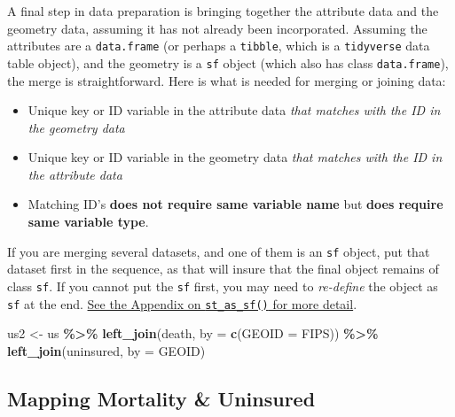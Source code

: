 \documentclass[
]{book}
\newenvironment{Shaded}{\begin{snugshade}}{\end{snugshade}}
\newcommand{\AttributeTok}[1]{\textcolor[rgb]{0.13,0.29,0.53}{#1}}
\newcommand{\FunctionTok}[1]{\textcolor[rgb]{0.13,0.29,0.53}{\textbf{#1}}}
\newcommand{\NormalTok}[1]{#1}
\newcommand{\OtherTok}[1]{\textcolor[rgb]{0.56,0.35,0.01}{#1}}
\newcommand{\SpecialCharTok}[1]{\textcolor[rgb]{0.81,0.36,0.00}{\textbf{#1}}}
\newcommand{\StringTok}[1]{\textcolor[rgb]{0.31,0.60,0.02}{#1}}
\providecommand{\tightlist}{%
  \setlength{\itemsep}{0pt}\setlength{\parskip}{0pt}}
\begin{document}
A final step in data preparation is bringing together the attribute data and the geometry data, assuming it has not already been incorporated. Assuming the attributes are a \texttt{data.frame} (or perhaps a \texttt{tibble}, which is a \texttt{tidyverse} data table object), and the geometry is a \texttt{sf} object (which also has class \texttt{data.frame}), the merge is straightforward. Here is what is needed for merging or joining data:

\begin{itemize}
\tightlist
\item
  Unique key or ID variable in the attribute data \emph{that matches with the ID in the geometry data}
\item
  Unique key or ID variable in the geometry data \emph{that matches with the ID in the attribute data}
\item
  Matching ID's \textbf{does not require same variable name} but \textbf{does require same variable type}.
\end{itemize}

If you are merging several datasets, and one of them is an \texttt{sf} object, put that dataset first in the sequence, as that will insure that the final object remains of class \texttt{sf}. If you cannot put the \texttt{sf} first, you may need to \emph{re-define} the object as \texttt{sf} at the end. \protect\hyperlink{st-as-sf}{See the Appendix on \texttt{st\_as\_sf()} for more detail}.

\begin{Shaded}
\begin{Highlighting}[]
\NormalTok{us2 }\OtherTok{\textless{}{-}}\NormalTok{ us }\SpecialCharTok{\%\textgreater{}\%}
  \FunctionTok{left\_join}\NormalTok{(death, }\AttributeTok{by =} \FunctionTok{c}\NormalTok{(}\StringTok{\textquotesingle{}GEOID\textquotesingle{}} \OtherTok{=} \StringTok{\textquotesingle{}FIPS\textquotesingle{}}\NormalTok{)) }\SpecialCharTok{\%\textgreater{}\%}
  \FunctionTok{left\_join}\NormalTok{(uninsured, }\AttributeTok{by =} \StringTok{\textquotesingle{}GEOID\textquotesingle{}}\NormalTok{)}
\end{Highlighting}
\end{Shaded}

\hypertarget{mapping-mortality-uninsured}{%
\subsection{Mapping Mortality \& Uninsured}\label{mapping-mortality-uninsured}}
\end{document}

